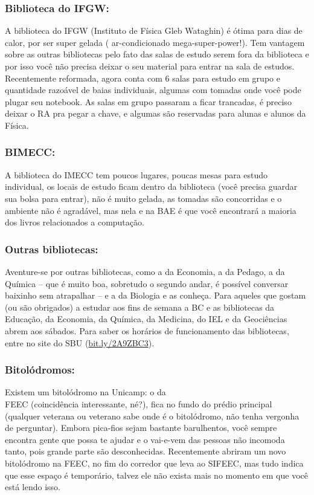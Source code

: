 \subsubsection{Biblioteca do IFGW:} A biblioteca do IFGW (Instituto de Física
Gleb Wataghin) é ótima para dias de calor, por ser super gelada (
ar-condicionado mega-super-power!). Tem vantagem sobre as outras bibliotecas
pelo fato das salas de estudo serem fora da biblioteca e por isso você não
precisa deixar o seu material para entrar na sala de estudos. Recentemente
reformada, agora conta com 6 salas para estudo em grupo e quantidade razoável
de baias individuais, algumas com tomadas onde você pode plugar seu notebook.
As salas em grupo passaram a ficar trancadas, é preciso deixar o RA pra pegar a
chave, e algumas são reservadas para alunas e alunos da Física.

\subsubsection{BIMECC:} A biblioteca do IMECC tem poucos lugares, poucas mesas
para estudo individual, os locais de estudo ficam dentro da biblioteca (você
precisa guardar sua bolsa para entrar), não é muito gelada, as tomadas são
concorridas e o ambiente não é agradável, mas nela e na BAE é que você
encontrará a maioria dos livros relacionados a computação.

\subsubsection{Outras bibliotecas:} Aventure-se por outras bibliotecas, como a
da Economia, a da Pedago, a da Química -- que é muito boa, sobretudo o segundo
andar, é possível conversar baixinho sem atrapalhar -- e a da Biologia e as
conheça. Para aqueles que gostam (ou são obrigados) a estudar aos fins de
semana a BC e as bibliotecas da Educação, da Economia, da Química, da Medicina,
do IEL e da Geociências abrem aos sábados. Para saber os horários de
funcionamento das bibliotecas, entre no site do SBU
(\url{bit.ly/2A9ZBC3}).

\subsubsection{Bitolódromos:} Existem um bitolódromo na Unicamp: o da\\FEEC
(coincidência interessante, né?), fica no fundo do prédio principal (qualquer
veterana ou veterano sabe onde é o bitolódromo, não tenha vergonha de
perguntar). Embora pica-fios sejam bastante barulhentos, você sempre encontra
gente que possa te ajudar e o vai-e-vem das pessoas não incomoda tanto, pois
grande parte são desconhecidas. Recentemente abriram um novo bitolódromo na
FEEC, no fim do corredor que leva ao SIFEEC, mas tudo indica que esse espaço é
temporário, talvez ele não exista mais no momento em que você está lendo isso.

